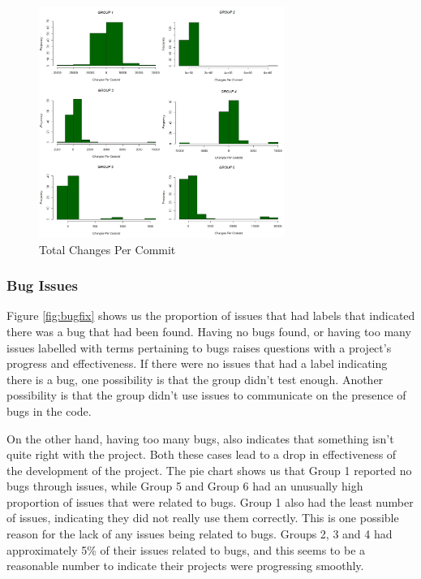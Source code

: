 \documentclass{acm_proc_article-sp}
\begin{document}
\begin{figure}[h]
\centering
\includegraphics[width=8cm]{img/changed_per_commit}
\caption{Total Changes Per Commit}
\label{fig:commit_changes}
\end{figure}

\subsubsection{Bug Issues}

Figure \ref{fig:bugfix} shows us the proportion of issues that had labels that indicated there was a bug that had been found. Having no bugs found, or having too many issues labelled with terms pertaining to bugs raises questions with a project's progress and effectiveness. If there were no issues that had a label indicating there is a bug, one possibility is that the group didn't test enough. Another possibility is that the group didn't use issues to communicate on the presence of bugs in the code. 

On the other hand, having too many bugs, also indicates that something isn't quite right with the project. Both these cases lead to a drop in effectiveness of the development of the project. The pie chart shows us that Group 1 reported no bugs through issues, while Group 5 and Group 6 had an unusually high proportion of issues that were related to bugs. Group 1 also had the least number of issues, indicating they did not really use them correctly. This is one possible reason for the lack of any issues being related to bugs. Groups 2, 3 and 4 had approximately 5\% of their issues related to bugs, and this seems to be a reasonable number to indicate their projects were progressing smoothly.
\end{document}
